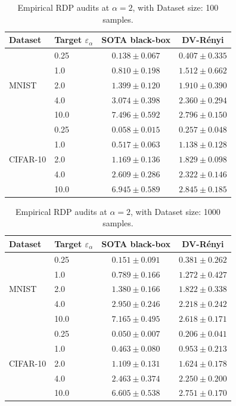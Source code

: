 \documentclass{article}
\theoremstyle{plain}
\theoremstyle{definition}
\theoremstyle{remark}
\begin{document}
\begin{table}[t]
\centering
\caption{Empirical RDP audits at $\alpha=2$, with Dataset size: 100 samples.}
\label{tab:alpha2-100samples}
\begin{tabular}{llcc}
\toprule
Dataset & Target $\varepsilon_\alpha$ & SOTA black-box \cite{muthu2024nearly} & DV-R\'enyi \\
\midrule
\multirow{5}{*}{MNIST} & 0.25 & $0.138 \pm 0.067$ & $\mathbf{0.407} \pm 0.335$ \\
 & 1.0 & $0.810 \pm 0.198$ & $\mathbf{1.512} \pm 0.662$ \\
 & 2.0 & $1.399 \pm 0.120$ & $\mathbf{1.910} \pm 0.390$ \\
 & 4.0 & $\mathbf{3.074} \pm 0.398$ & $2.360 \pm 0.294$ \\
 & 10.0 & $\mathbf{7.496} \pm 0.592$ & $2.796 \pm 0.150$ \\
\midrule
\multirow{5}{*}{CIFAR-10} & 0.25 & $0.058 \pm 0.015$ & $\mathbf{0.257} \pm 0.048$ \\
 & 1.0 & $0.517 \pm 0.063$ & $\mathbf{1.138} \pm 0.128$ \\
 & 2.0 & $1.169 \pm 0.136$ & $\mathbf{1.829} \pm 0.098$ \\
 & 4.0 & $\mathbf{2.609} \pm 0.286$ & $2.322 \pm 0.146$ \\
 & 10.0 & $\mathbf{6.945} \pm 0.589$ & $2.845 \pm 0.185$ \\
\bottomrule
\end{tabular}
\end{table}

\begin{table}[t]
\centering
\caption{Empirical RDP audits at $\alpha=2$, with Dataset size: 1000 samples.}
\label{tab:alpha2-1000samples}
\begin{tabular}{llcc}
\toprule
Dataset & Target $\varepsilon_\alpha$ & SOTA black-box \cite{muthu2024nearly} & DV-R\'enyi \\
\midrule
\multirow{5}{*}{MNIST} & 0.25 & $0.151 \pm 0.091$ & $\mathbf{0.381} \pm 0.262$ \\
 & 1.0 & $0.789 \pm 0.166$ & $\mathbf{1.272} \pm 0.427$ \\
 & 2.0 & $1.380 \pm 0.166$ & $\mathbf{1.822} \pm 0.338$ \\
 & 4.0 & $\mathbf{2.950} \pm 0.246$ & $2.218 \pm 0.242$ \\
 & 10.0 & $\mathbf{7.165} \pm 0.495$ & $2.618 \pm 0.171$ \\
\midrule
\multirow{5}{*}{CIFAR-10} & 0.25 & $0.050 \pm 0.007$ & $\mathbf{0.206} \pm 0.041$ \\
 & 1.0 & $0.463 \pm 0.080$ & $\mathbf{0.953} \pm 0.213$ \\
 & 2.0 & $1.109 \pm 0.131$ & $\mathbf{1.624} \pm 0.178$ \\
 & 4.0 & $\mathbf{2.463} \pm 0.374$ & $2.250 \pm 0.200$ \\
 & 10.0 & $\mathbf{6.605} \pm 0.538$ & $2.751 \pm 0.170$ \\
\bottomrule
\end{tabular}
\end{table}
\end{document}
